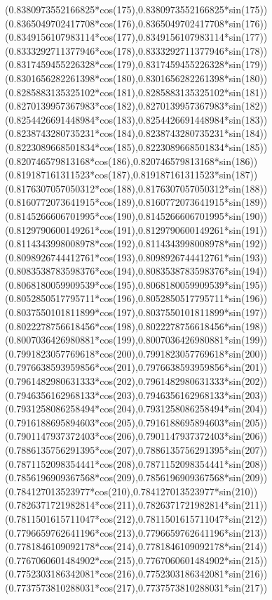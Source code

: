 {({0.8380973552166825*cos(175)},{0.8380973552166825*sin(175)})
({0.8365049702417708*cos(176)},{0.8365049702417708*sin(176)})
({0.8349156107983114*cos(177)},{0.8349156107983114*sin(177)})
({0.8333292711377946*cos(178)},{0.8333292711377946*sin(178)})
({0.8317459455226328*cos(179)},{0.8317459455226328*sin(179)})
({0.8301656282261398*cos(180)},{0.8301656282261398*sin(180)})
({0.8285883135325102*cos(181)},{0.8285883135325102*sin(181)})
({0.8270139957367983*cos(182)},{0.8270139957367983*sin(182)})
({0.8254426691448984*cos(183)},{0.8254426691448984*sin(183)})
({0.8238743280735231*cos(184)},{0.8238743280735231*sin(184)})
({0.8223089668501834*cos(185)},{0.8223089668501834*sin(185)})
({0.820746579813168*cos(186)},{0.820746579813168*sin(186)})
({0.819187161311523*cos(187)},{0.819187161311523*sin(187)})
({0.8176307057050312*cos(188)},{0.8176307057050312*sin(188)})
({0.8160772073641915*cos(189)},{0.8160772073641915*sin(189)})
({0.8145266606701995*cos(190)},{0.8145266606701995*sin(190)})
({0.8129790600149261*cos(191)},{0.8129790600149261*sin(191)})
({0.8114343998008978*cos(192)},{0.8114343998008978*sin(192)})
({0.8098926744412761*cos(193)},{0.8098926744412761*sin(193)})
({0.8083538783598376*cos(194)},{0.8083538783598376*sin(194)})
({0.8068180059909539*cos(195)},{0.8068180059909539*sin(195)})
({0.8052850517795711*cos(196)},{0.8052850517795711*sin(196)})
({0.8037550101811899*cos(197)},{0.8037550101811899*sin(197)})
({0.8022278756618456*cos(198)},{0.8022278756618456*sin(198)})
({0.8007036426980881*cos(199)},{0.8007036426980881*sin(199)})
({0.7991823057769618*cos(200)},{0.7991823057769618*sin(200)})
({0.7976638593959856*cos(201)},{0.7976638593959856*sin(201)})
({0.7961482980631333*cos(202)},{0.7961482980631333*sin(202)})
({0.7946356162968133*cos(203)},{0.7946356162968133*sin(203)})
({0.7931258086258494*cos(204)},{0.7931258086258494*sin(204)})
({0.7916188695894603*cos(205)},{0.7916188695894603*sin(205)})
({0.7901147937372403*cos(206)},{0.7901147937372403*sin(206)})
({0.7886135756291395*cos(207)},{0.7886135756291395*sin(207)})
({0.7871152098354441*cos(208)},{0.7871152098354441*sin(208)})
({0.7856196909367568*cos(209)},{0.7856196909367568*sin(209)})
({0.784127013523977*cos(210)},{0.784127013523977*sin(210)})
({0.7826371721982814*cos(211)},{0.7826371721982814*sin(211)})
({0.7811501615711047*cos(212)},{0.7811501615711047*sin(212)})
({0.7796659762641196*cos(213)},{0.7796659762641196*sin(213)})
({0.7781846109092178*cos(214)},{0.7781846109092178*sin(214)})
({0.7767060601484902*cos(215)},{0.7767060601484902*sin(215)})
({0.7752303186342081*cos(216)},{0.7752303186342081*sin(216)})
({0.7737573810288031*cos(217)},{0.7737573810288031*sin(217)})
}
